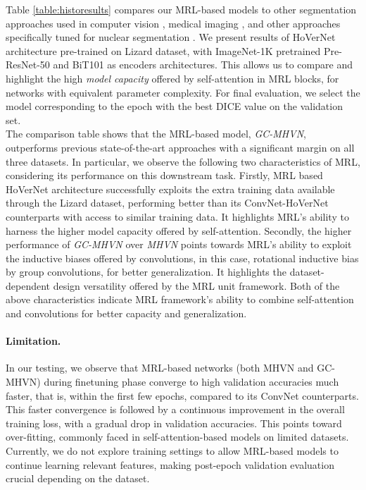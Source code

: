 \documentclass{article}
\begin{document}
\noindent Table \ref{table:historesults} compares our MRL-based models to other segmentation approaches used in computer vision \cite{Mask-RCNN}, medical imaging \cite{UNet}, and other approaches specifically tuned for nuclear segmentation \cite{DBLP:journals/corr/hovernet, Brp-net, cia-net, micro-net, DSF-CNN}. We present results of HoVerNet architecture pre-trained on Lizard dataset, \cite{DBLP:journals/corr/hovernet} with ImageNet-1K pretrained Pre-ResNet-50 \cite{preactrestnet} and BiT101 \cite{bitM} as encoders architectures. This allows us to compare and highlight the high \textit{model capacity} offered by self-attention in MRL blocks, for networks with equivalent parameter complexity. For final evaluation, we select the model corresponding to the epoch with the best DICE value on the validation set. \\
\indent The comparison table shows that the MRL-based model, \textit{GC-MHVN}, outperforms previous state-of-the-art approaches with a significant margin on all three datasets. In particular, we observe the following two characteristics of MRL, considering its performance on this downstream task. Firstly, MRL based HoVerNet architecture successfully exploits the extra training data available through the Lizard dataset, performing better than its ConvNet-HoVerNet counterparts with access to similar training data. It highlights MRL's ability to harness the higher model capacity offered by self-attention. Secondly, the higher performance of \textit{GC-MHVN} over \textit{MHVN} points towards MRL's ability to exploit the inductive biases offered by convolutions, in this case, rotational inductive bias by group convolutions, for better generalization. It highlights the dataset-dependent design versatility offered by the MRL unit framework. Both of the above characteristics indicate MRL framework's ability to combine self-attention and convolutions for better capacity and generalization. 

\paragraph{Limitation.} In our testing, we observe that MRL-based networks (both MHVN and GC-MHVN) during finetuning phase converge to high validation accuracies much faster, that is, within the first few epochs, compared to its ConvNet counterparts. This faster convergence is followed by a continuous improvement in the overall training loss, with a gradual drop in validation accuracies. This points toward over-fitting, commonly faced in self-attention-based models on limited datasets. Currently, we do not explore training settings to allow MRL-based models to continue learning relevant features, making post-epoch validation evaluation crucial depending on the dataset. 
\end{document}
